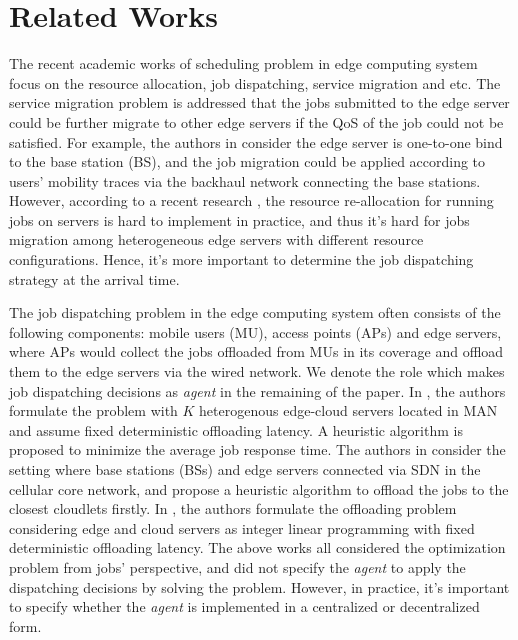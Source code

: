 \section{Related Works}
\label{sec:review}
The recent academic works of scheduling problem in edge computing system focus on the resource allocation, job dispatching, service migration and etc.
The service migration problem is addressed that the jobs submitted to the edge server could be further migrate to other edge servers if the QoS of the job could not be satisfied.
For example, the authors in \cite{TON19-WangSq} consider the edge server is one-to-one bind to the base station (BS), and the job migration could be applied according to users' mobility traces via the backhaul network connecting the base stations.
However, according to a recent research \cite{INFOCOM19-WuC}, the resource re-allocation for running jobs on servers is hard to implement in practice, and thus it's hard for jobs migration among heterogeneous edge servers with different resource configurations.
Hence, it's more important to determine the job dispatching strategy at the arrival time.

The job dispatching problem in the edge computing system often consists of the following components: mobile users (MU), access points (APs) and edge servers, where APs would collect the jobs offloaded from MUs in its coverage and offload them to the edge servers via the wired network.
We denote the role which makes job dispatching decisions as \emph{agent} in the remaining of the paper.
In \cite{tan-online}, the authors formulate the problem with $K$ heterogenous edge-cloud servers located in MAN and assume fixed deterministic offloading latency.
A heuristic algorithm is proposed to minimize the average job response time.
The authors in \cite{IOTJ18-FanQ} consider the setting where base stations (BSs) and edge servers connected via SDN in the cellular core network, and propose a heuristic algorithm to offload the jobs to the closest cloudlets firstly.
In \cite{MASS18-MengZ}, the authors formulate the offloading problem considering edge and cloud servers as integer linear programming with fixed deterministic offloading latency.
The above works all considered the optimization problem from jobs' perspective, and did not specify the \emph{agent} to apply the dispatching decisions by solving the problem.
However, in practice, it's important to specify whether the \emph{agent} is implemented in a centralized or decentralized form.

